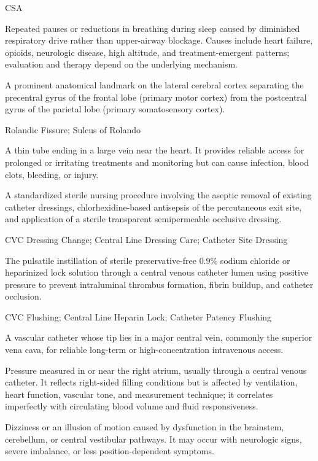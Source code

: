 \synonyms
CSA

 Repeated pauses or reductions in breathing during sleep caused by diminished respiratory drive rather than upper-airway blockage. Causes include heart failure, opioids, neurologic disease, high altitude, and treatment-emergent patterns; evaluation and therapy depend on the underlying mechanism.

 A prominent anatomical landmark on the lateral cerebral cortex separating the precentral gyrus of the frontal lobe (primary motor cortex) from the postcentral gyrus of the parietal lobe (primary somatosensory cortex).

\synonyms
Rolandic Fissure; Sulcus of Rolando

 A thin tube ending in a large vein near the heart. It provides reliable access for prolonged or irritating treatments and monitoring but can cause infection, blood clots, bleeding, or injury.

 A standardized sterile nursing procedure involving the aseptic removal of existing catheter dressings, chlorhexidine-based antisepsis of the percutaneous exit site, and application of a sterile transparent semipermeable occlusive dressing.

\synonyms
CVC Dressing Change; Central Line Dressing Care; Catheter Site Dressing

 The pulsatile instillation of sterile preservative-free $0.9\%$ sodium chloride or heparinized lock solution through a central venous catheter lumen using positive pressure to prevent intraluminal thrombus formation, fibrin buildup, and catheter occlusion.

\synonyms
CVC Flushing; Central Line Heparin Lock; Catheter Patency Flushing

 A vascular catheter whose tip lies in a major central vein, commonly the superior vena cava, for reliable long-term or high-concentration intravenous access.

 Pressure measured in or near the right atrium, usually through a central venous catheter. It reflects
right-sided filling conditions but is affected by ventilation, heart function, vascular tone,
and measurement technique; it correlates imperfectly with circulating blood volume and fluid responsiveness.

 Dizziness or an illusion of motion caused by dysfunction in the brainstem, cerebellum, or central vestibular pathways. It may occur with neurologic signs, severe imbalance, or less position-dependent symptoms.

